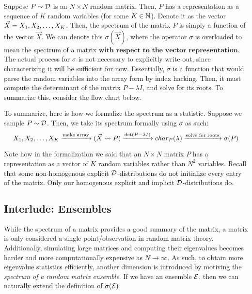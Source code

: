 \begin{formalization}
Suppose $P \sim \D$ is an $N \times N$ random matrix.
Then, $P$ has a representation as a sequence of $K$ random variables (for some $K \in \N$).
Denote it as the vector $\vec{X} = \seqo[K]{X}$.
Then, the spectrum of the matrix $P$ is simply a function of the vector $\vec{X}$.
We can denote this $\sigma(\vec{X})$, where the operator $\sigma$ is overloaded to mean the spectrum of a matrix $\textbf{with respect to the vector representation}$.
The actual process for $\sigma$ is not necessary to explicitly write out, since characterizing it will be sufficient for now.
Essentially, $\sigma$ is a function that would parse the random variables into the array form by index hacking.
Then, it must compute the determinant of the matrix $P - \lambda I$, and solve for its roots.
To summarize this, consider the flow chart below.
\end{formalization}

To summarize, here is how we formalize the spectrum as a statistic. Suppose we sample $P \sim \D$. Then, we take its spectrum formally using $\sigma$ as such:\hfill
$$ X_1,X_2,\dots,X_K \xra{\text{make array}} (\vec{X} \rightsquigarrow P) \xra{\det(P - \lambda I)} char_{P}(\lambda) \xra{\text{solve for roots}} \sigma(P) $$

\begin{remark}[Formalization]
Note how in the formalization we said that an $N \times N$ matrix $P$ has a representation as a vector of $K$ random variables rather than $N^2$ variables.
Recall that some non-homogenous explicit $\D$-distributions do not initialize every entry of the matrix. Only our homogenous explicit and implicit $\D$-distributions do.
\end{remark}

\subsection{Interlude: Ensembles}
While the spectrum of a matrix provides a good summary of the matrix, a matrix is only considered a single point/observation in random matrix theory.
Additionally, simulating large matrices and computing their eigenvalues becomes harder and more computationally expensive as $N \to \infty$.
As such, to obtain more eigenvalue statistics efficiently, another dimension is introduced by motiving the \textit{spectrum of a random matrix ensemble}.
If we have an ensemble $\Ens$, then we can naturally extend the definition of $\sigma(\Ens)$.

